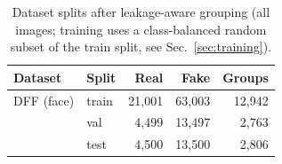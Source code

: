 \begin{table}[!t]
\centering
\caption{Dataset splits after leakage-aware grouping (all images; training uses a class-balanced random subset of the train split, see Sec.~\ref{sec:training}).}
\label{tab:dataset}
\begin{tabular}{llrrr}
\toprule
Dataset & Split & Real & Fake & Groups \\
\midrule
DFF (face) & train & 21,001 & 63,003 & 12,942 \\
 & val & 4,499 & 13,497 & 2,763 \\
 & test & 4,500 & 13,500 & 2,806 \\
\bottomrule
\end{tabular}
\end{table}

